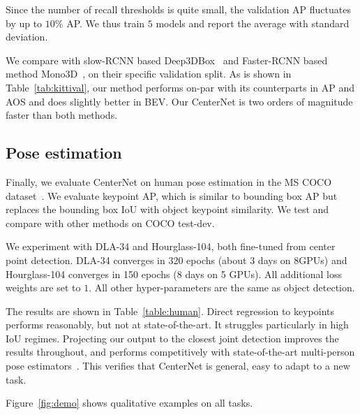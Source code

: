 \documentclass[10pt,twocolumn,letterpaper]{article}
\begin{document}
Since the number of recall thresholds is quite small, the validation AP fluctuates by up to $10\%$ AP.
We thus train $5$ models and report the average with standard deviation.

We compare with slow-RCNN based Deep3DBox~\cite{mousavian20173d} and Faster-RCNN based method Mono3D~\cite{chen2016monocular}, on their specific validation split.
As is shown in Table~\ref{tab:kittival}, our method performs on-par with its counterparts in AP and AOS and does slightly better in BEV.
Our CenterNet is two orders of magnitude faster than both methods.

\subsection{Pose estimation}

Finally, we evaluate CenterNet on human pose estimation in the MS COCO dataset~\cite{lin2014microsoft}.
We evaluate keypoint AP, which is similar to bounding box AP but replaces the bounding box IoU with object keypoint similarity.
We test and compare with other methods on COCO test-dev.

We experiment with DLA-34 and Hourglass-104, both fine-tuned from center point detection.
DLA-34 converges in 320 epochs (about 3 days on 8GPUs) and Hourglass-104 converges in 150 epochs (8 days on 5 GPUs).
All additional loss weights are set to $1$.
All other hyper-parameters are the same as object detection.

The results are shown in Table~\ref{table:human}.
Direct regression to keypoints performs reasonably, but not at state-of-the-art.
It struggles particularly in high IoU regimes.
Projecting our output to the closest joint detection improves the results throughout, and performs competitively with state-of-the-art multi-person pose estimators~\cite{cao2017realtime,newell2017associative,he2017mask,papandreou2018personlab}.
This verifies that CenterNet is general, easy to adapt to a new task.

Figure~\ref{fig:demo} shows qualitative examples on all tasks.
\end{document}
